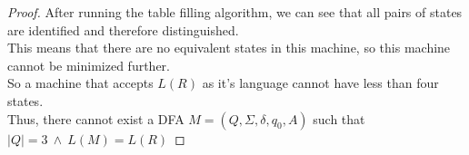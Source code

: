 \documentclass{article}
\begin{document}
\begin{proof}
After running the table filling algorithm, we can see that all pairs of states are identified and therefore distinguished.\\
This means that there are no equivalent states in this machine, so this machine cannot be minimized further.\\
So a machine that accepts $L(R)$ as it's language cannot have less than four states.\\
Thus, there cannot exist a DFA $M = (Q, \Sigma, \delta, q_0, A)$ such that $|Q| = 3 \ \wedge \ L(M) = L(R)$

\end{proof}
\end{document}
